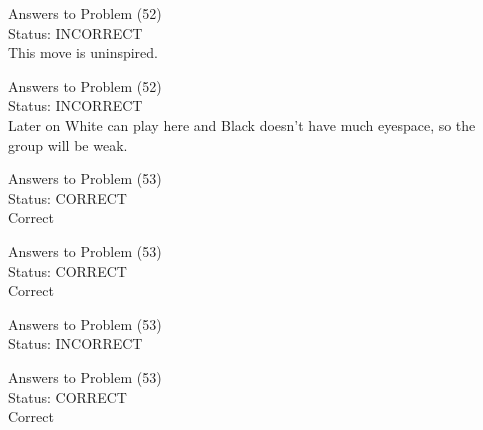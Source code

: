 \documentclass[11pt]{article}
\begin{document}
\begin{minipage}[t]{0.5\textwidth}
  {\centering
  
  Answers to Problem (52)\\
  Status: INCORRECT\\
  This move is uninspired.\\
  }
\end{minipage}
\begin{minipage}[t]{0.5\textwidth}
  {\centering
  
  Answers to Problem (52)\\
  Status: INCORRECT\\
  Later on White can play here and Black doesn't have much eyespace, so the group will be weak.\\
  }
\end{minipage}
\begin{minipage}[t]{0.5\textwidth}
  {\centering
  
  Answers to Problem (53)\\
  Status: CORRECT\\
  Correct\\
  }
\end{minipage}
\begin{minipage}[t]{0.5\textwidth}
  {\centering
  
  Answers to Problem (53)\\
  Status: CORRECT\\
  Correct\\
  }
\end{minipage}
\begin{minipage}[t]{0.5\textwidth}
  {\centering
  
  Answers to Problem (53)\\
  Status: INCORRECT\\
  
  }
\end{minipage}
\begin{minipage}[t]{0.5\textwidth}
  {\centering
  
  Answers to Problem (53)\\
  Status: CORRECT\\
  Correct\\
  }
\end{minipage}
\end{document}
